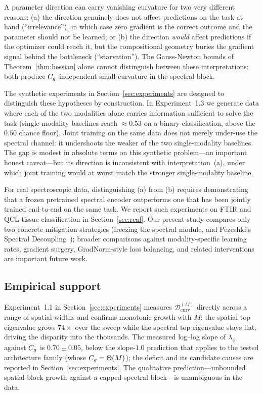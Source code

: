 \begin{remark}
\label{rem:irrelevance_vs_starvation}
A parameter direction can carry vanishing curvature for two very
different reasons: (a) the direction genuinely does not affect
predictions on the task at hand (``irrelevance''), in which case zero
gradient is the correct outcome and the parameter should not be
learned; or (b) the direction \emph{would} affect predictions if the
optimizer could reach it, but the compositional geometry buries the
gradient signal behind the bottleneck (``starvation''). The
Gauss-Newton bounds of Theorem~\ref{thm:hessian} alone cannot
distinguish between these interpretations: both produce
$C_g$-independent small curvature in the spectral block.

The synthetic experiments in Section~\ref{sec:experiments} are
designed to distinguish these hypotheses by construction. In
Experiment~1.3 we generate data where each of the two modalities alone
carries information sufficient to solve the task (single-modality
baselines reach $\approx 0.53$ on a binary classification, above the
$0.50$ chance floor). Joint training on the same data does not merely
under-use the spectral channel: it undershoots the weaker of the two
single-modality baselines. The gap is modest in absolute terms on this
synthetic problem---an important honest caveat---but its direction is
inconsistent with interpretation~(a), under which joint training
would at worst match the stronger single-modality baseline.

For real spectroscopic data, distinguishing (a) from (b) requires
demonstrating that a frozen pretrained spectral encoder outperforms
one that has been jointly trained end-to-end on the same task. We
report such experiments on FTIR and QCL tissue classification in
Section~\ref{sec:real}. Our present study compares only two
concrete mitigation strategies (freezing the spectral module, and
Pezeshki's Spectral
Decoupling~\cite{pezeshki2021gradient}); broader comparisons against
modality-specific learning rates, gradient surgery, GradNorm-style
loss balancing, and related interventions are important future work.
\end{remark}

\subsection{Empirical support}

Experiment~1.1 in Section~\ref{sec:experiments} measures
$\mathcal{D}_{\mathrm{curv}}^{(M)}$ directly across a range of
spatial widths and confirms monotonic growth with $M$: the spatial
top eigenvalue grows $74\times$ over the sweep while the spectral
top eigenvalue stays flat, driving the disparity into the thousands.
The measured log--log slope of $\lambda_\phi$ against $C_g$ is
$0.70 \pm 0.05$, below the slope-$1.0$ prediction that applies to
the tested architecture family (whose $C_g = \Theta(M)$); the
deficit and its candidate causes are reported in
Section~\ref{sec:experiments}. The qualitative
prediction---unbounded spatial-block growth against a capped
spectral block---is unambiguous in the data.

